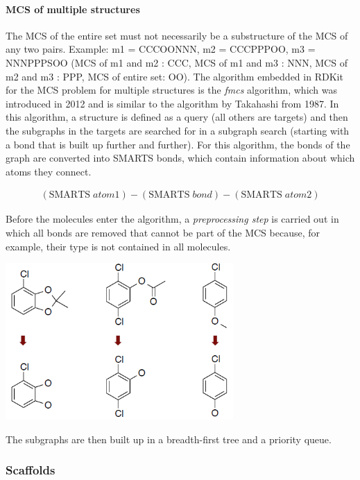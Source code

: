 %

\paragraph{MCS of multiple structures}
The MCS of the entire set must not necessarily be a substructure of the MCS of any two pairs. Example: m1 = CCCOONNN, m2 = CCCPPPOO, m3 = NNNPPPSOO (MCS of m1 and m2 : CCC, MCS of m1 and m3 : NNN, MCS of m2 and m3 : PPP, MCS of entire set: OO). The algorithm embedded in RDKit for the MCS problem for multiple structures is the \emph{fmcs} algorithm, which was introduced in 2012 and is similar to the algorithm by Takahashi from 1987. In this algorithm, a structure is defined as a query (all others are targets) and then the subgraphs in the targets are searched for in a subgraph search (starting with a bond that is built up further and further). For this algorithm, the bonds of the graph are converted into SMARTS bonds, which contain information about which atoms they connect.

\begin{align}
    (\mathrm{SMARTS}\;atom1)-(\mathrm{SMARTS}\;bond)-(\mathrm{SMARTS}\;atom2)
\end{align}

Before the molecules enter the algorithm, a \emph{preprocessing step} is carried out in which all bonds are removed that cannot be part of the MCS because, for example, their type is not contained in all molecules.

\begin{center}\includegraphics[width=0.65\textwidth]{img/cheminformatics/McsFmcsPreprocessing.png}\end{center}

The subgraphs are then built up in a breadth-first tree and a priority queue.

\subsubsection{Scaffolds}

